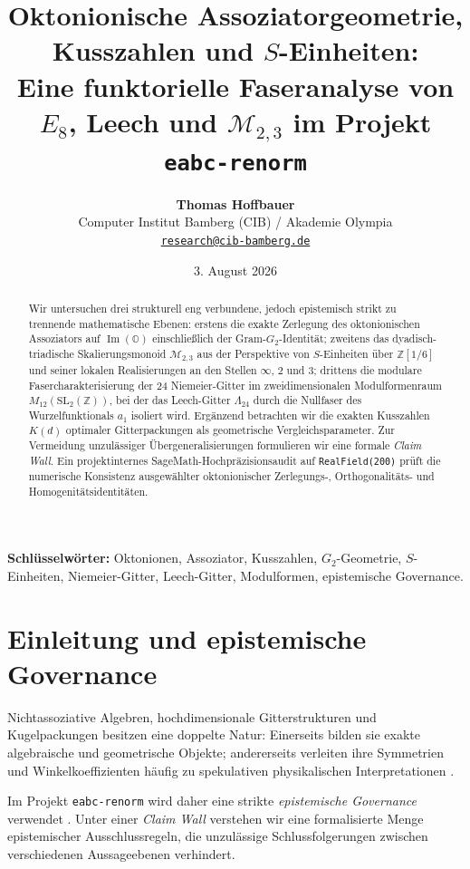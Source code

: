 \documentclass[11pt,a4paper]{article}
\title{\textbf{Oktonionische Assoziatorgeometrie, Kusszahlen und $S$-Einheiten:}\\[0.5em]
\Large Eine funktorielle Faseranalyse von $E_8$, Leech und $\mathcal{M}_{2,3}$ im Projekt \texttt{eabc-renorm}}
\author{\textbf{Thomas Hoffbauer}\\
\small Computer Institut Bamberg (CIB) / Akademie Olympia\\
\small \href{mailto:research@cib-bamberg.de}{\texttt{research@cib-bamberg.de}}}
\date{3. August 2026}
\newcommand{\ImO}{\operatorname{Im}(\mathbb{O})}
\newcommand{\Mmon}{\mathcal{M}_{2,3}}
\begin{document}
\maketitle

\begin{abstract}
Wir untersuchen drei strukturell eng verbundene, jedoch epistemisch strikt zu trennende mathematische Ebenen: erstens die exakte Zerlegung des oktonionischen Assoziators auf $\ImO$ einschließlich der Gram-$G_2$-Identität; zweitens das dyadisch-triadische Skalierungsmonoid $\Mmon$ aus der Perspektive von $S$-Einheiten über $\mathbb{Z}[1/6]$ und seiner lokalen Realisierungen an den Stellen $\infty$, $2$ und $3$; drittens die modulare Fasercharakterisierung der 24 Niemeier-Gitter im zweidimensionalen Modulformenraum $M_{12}(\mathrm{SL}_2(\mathbb{Z}))$, bei der das Leech-Gitter $\Lambda_{24}$ durch die Nullfaser des Wurzelfunktionals $a_1$ isoliert wird. Ergänzend betrachten wir die exakten Kusszahlen $K(d)$ optimaler Gitterpackungen als geometrische Vergleichsparameter. Zur Vermeidung unzulässiger Übergeneralisierungen formulieren wir eine formale \emph{Claim Wall}. Ein projektinternes SageMath-Hochpräzisionsaudit auf \texttt{RealField(200)} prüft die numerische Konsistenz ausgewählter oktonionischer Zerlegungs-, Orthogonalitäts- und Homogenitätsidentitäten.
\end{abstract}

\noindent\textbf{Schlüsselwörter:} Oktonionen, Assoziator, Kusszahlen, $G_2$-Geometrie, $S$-Einheiten, Niemeier-Gitter, Leech-Gitter, Modulformen, epistemische Governance.

\tableofcontents
\newpage

\section{Einleitung und epistemische Governance}

Nichtassoziative Algebren, hochdimensionale Gitterstrukturen und Kugelpackungen besitzen eine doppelte Natur: Einerseits bilden sie exakte algebraische und geometrische Objekte; andererseits verleiten ihre Symmetrien und Winkelkoeffizienten häufig zu spekulativen physikalischen Interpretationen \cite{schafer,baez}.

Im Projekt \texttt{eabc-renorm} wird daher eine strikte \emph{epistemische Governance} verwendet \cite{eabcAudit}. Unter einer \emph{Claim Wall} verstehen wir eine formalisierte Menge epistemischer Ausschlussregeln, die unzulässige Schlussfolgerungen zwischen verschiedenen Aussageebenen verhindert.
\end{document}
